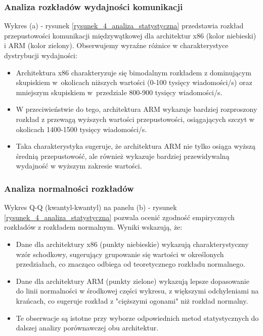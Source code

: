 \subsubsection{Analiza rozkładów wydajności komunikacji}
Wykres (a) - rysunek \ref{rysunek_4_analiza_statystyczna} przedstawia rozkład przepustowości komunikacji międzywątkowej dla architektur x86 (kolor niebieski) i ARM (kolor zielony). Obserwujemy wyraźne różnice w charakterystyce dystrybucji wydajności:
\begin{itemize}
    \item Architektura x86 charakteryzuje się bimodalnym rozkładem z dominującym skupiskiem w~okolicach niższych wartości (0-100 tysięcy wiadomości/s) oraz mniejszym skupiskiem w~przedziale 800-900 tysięcy wiadomości/s.
    \item W przeciwieństwie do tego, architektura ARM wykazuje bardziej rozproszony rozkład z przewagą wyższych wartości przepustowości, osiągających szczyt w okolicach 1400-1500 tysięcy wiadomości/s.
    \item Taka charakterystyka sugeruje, że architektura ARM nie tylko osiąga wyższą średnią przepustowość, ale również wykazuje bardziej przewidywalną wydajność w wyższym zakresie wartości.
\end{itemize}

\subsubsection{Analiza normalności rozkładów}
Wykres Q-Q (kwantyl-kwantyl) na panelu (b) - rysunek \ref{rysunek_4_analiza_statystyczna} pozwala ocenić zgodność empirycznych rozkładów z rozkładem normalnym. Wyniki wskazują, że:
\begin{itemize}
    \item Dane dla architektury x86 (punkty niebieskie) wykazują charakterystyczny wzór schodkowy, sugerujący grupowanie się wartości w określonych przedziałach, co znacząco odbiega od teoretycznego rozkładu normalnego.
    \item Dane dla architektury ARM (punkty zielone) wykazują lepsze dopasowanie do linii normalności w środkowej części wykresu, z większymi odchyleniami na krańcach, co sugeruje rozkład z "cięższymi ogonami" niż rozkład normalny.
    \item Te obserwacje są istotne przy wyborze odpowiednich metod statystycznych do dalszej analizy porównawczej obu architektur.
\end{itemize}

